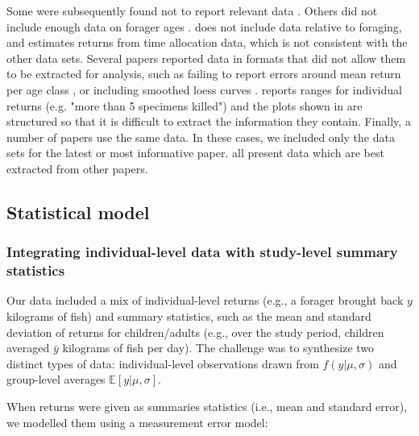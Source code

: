 Some were subsequently found not to report relevant data \citep{blurton_jones_foraging_1994, kraft_foraging_2019}. 
Others did not include enough data on forager ages \citep{bird_children_2002, hagino_high_2016, hooper_skills_2015, kramer_early_2009}.   
\citet{kramer_production_2005} does not include data relative to foraging, and \citet{kramer_does_2009} estimates returns from time allocation data, which is not consistent with the other data sets.  
Several papers reported data in formats that did not allow them to be extracted for analysis, such as failing to report errors around mean return per age class \citep{kaplan_evolution_1997, kaplan_theory_2000, kaplan_emergence_2002}, or including smoothed loess curves \citep{kaplan_evolutionary_1994, kaplan_theory_1996, kaplan_embodied_2003, marlowe_foraging_2010}. 
\citet{kawabe_development_1983} reports ranges for individual returns (e.g. "more than 5 specimens killed") and the plots shown in \citet{koster_hunting_2007} are structured so that it is difficult to extract the information they contain.
Finally, a number of papers use the same data. In these cases, we included only the data sets for the latest or most informative paper. \citet{bird_ethnoarchaeology_2000, blurton_jones_lives_1993, crittenden_allomaternal_2009, kramer_evolution_2011, mcelreath_using_2014, pollom_changes_2020, walker_evolution_2004} all present data which are best extracted from other papers.


\subsection{Statistical model}\label{SI:model}

\subsubsection{Integrating individual-level data with study-level summary statistics}

Our data included a mix of individual-level returns (e.g., a forager brought back $y$ kilograms of fish) and summary statistics, such as the mean and standard deviation of returns for children/adults (e.g., over the study period, children averaged $\bar{y}$ kilograms of fish per day). The challenge was to synthesize two distinct types of data: individual-level observations drawn from $f(y|\mu,\sigma)$ and group-level averages $\mathbb{E}[y|\mu,\sigma]$.

When returns were given as summaries statistics (i.e., mean and standard error), we modelled them using a measurement error model:

